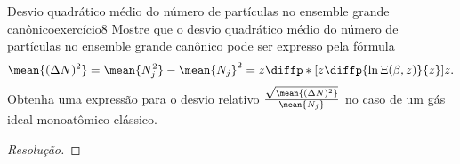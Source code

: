 \begin{exercício}{Desvio quadrático médio do número de partículas no ensemble grande canônico}{exercício8}
    Mostre que o desvio quadrático médio do número de partículas no ensemble grande canônico pode ser expresso pela fórmula
    \begin{equation*}
        \mean{(\Delta N)^2} = \mean{N_j^2}-\mean{N_j}^2 = z\diffp*{\left[z \diffp{\ln \Xi(\beta, z)}{z}\right]}{z}.
    \end{equation*}
    Obtenha uma expressão para o desvio relativo \(\frac{\sqrt{\mean{(\Delta N)^2}}}{\mean{N_j}}\) no caso de um gás ideal monoatômico clássico.
\end{exercício}
\begin{proof}[Resolução]

\end{proof}
